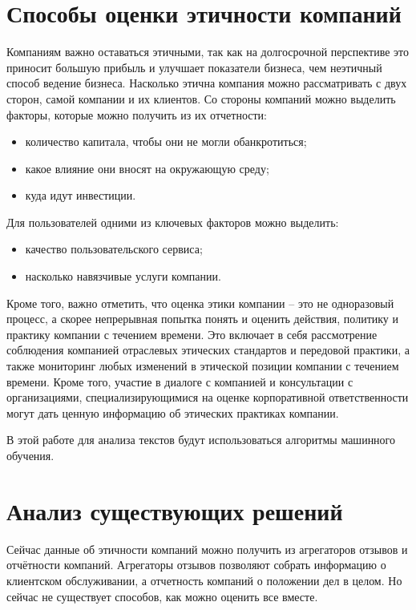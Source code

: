 \documentclass[PI, VKR]{HSEUniversity}
\begin{document}
\section{Способы оценки этичности компаний}
\label{sec:org386b1b1}
Компаниям важно оставаться этичными, так как на долгосрочной перспективе это приносит большую прибыль и улучшает показатели бизнеса, чем неэтичный способ ведение бизнеса\autocites{climent_ethical_2018}[][]{mure_esg_2021}. Насколько этична компания можно рассматривать с двух сторон, самой компании и их клиентов. Со стороны компаний можно выделить факторы, которые можно получить из их отчетности:
\begin{itemize}
\item количество капитала, чтобы они не могли обанкротиться;
\item какое влияние они вносят на окружающую среду;
\item куда идут инвестиции\autocite{harvey1995ethical}.
\end{itemize}
Для пользователей одними из ключевых факторов можно выделить:
\begin{itemize}
\item качество пользовательского сервиса\autocite{brunk2010exploring};
\item насколько навязчивые услуги компании\autocite{mitchell1992bank}.
\end{itemize}

Кроме того, важно отметить, что оценка этики компании -- это не одноразовый процесс, а скорее непрерывная попытка понять и оценить действия, политику и практику компании с течением времени. Это включает в себя рассмотрение соблюдения компанией отраслевых этических стандартов и передовой практики, а также мониторинг любых изменений в этической позиции компании с течением времени. Кроме того, участие в диалоге с компанией и консультации с организациями, специализирующимися на оценке корпоративной ответственности могут дать ценную информацию об этических практиках компании.

В этой работе для анализа текстов будут использоваться алгоритмы машинного обучения.
\section{Анализ существующих решений}
\label{sec:org9e7e1c5}
Сейчас данные об этичности компаний можно получить из агрегаторов отзывов и отчётности компаний. Агрегаторы отзывов позволяют собрать информацию о клиентском обслуживании, а отчетность компаний о положении дел в целом. Но сейчас не существует способов, как можно оценить все вместе.
\end{document}
